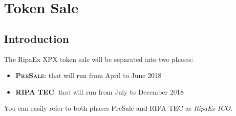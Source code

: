 \documentclass[11pt,fleqn,oneside]{book} %
\begin{document}

\chapter{Token Sale}
\section{Introduction}
The RipaEx XPX token sale will be separated into two phases:
	\begin{itemize}
		\item \textbf{\textsc{PreSale}}: that will run from April to June 2018
		\item \textbf{\textsc{RIPA TEC}}: that will run from July to December 2018
	\end{itemize}
\vspace{5mm}
You can easily refer to both phases PreSale and RIPA TEC as \textit{RipaEx ICO}.
\end{document}
